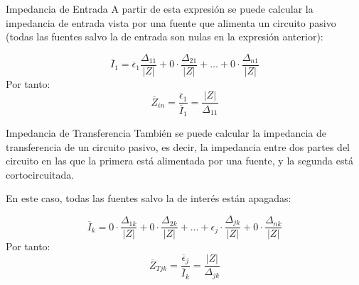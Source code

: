 \documentclass[aspectratio=169, usenames,svgnames,dvipsnames]{beamer}
\begin{document}
\begin{frame}[label={sec:org933db58}]{Impedancia de Entrada}
A partir de esta expresión se puede calcular la impedancia de entrada vista por una fuente que alimenta un circuito pasivo (todas las fuentes salvo la de entrada son nulas en la expresión anterior):

\[
  \overline{I}_1 = \overline{\epsilon}_1 \frac{\Delta_{11}}{|Z|} + 0 \cdot \frac{\Delta_{21}}{|Z|} + \dots + 0 \cdot \frac{\Delta_{n1}}{|Z|}
\]
Por tanto:
\[
  \boxed{\overline{Z}_{in} = \frac{\overline{\epsilon}_1}{\overline{I}_1}=  \frac{|Z|}{\Delta_{11}}}
\]
\end{frame}

\begin{frame}[label={sec:org719d771}]{Impedancia de Transferencia}
También se puede calcular la impedancia de transferencia de un circuito pasivo, es decir, la impedancia entre dos partes del circuito en las que la primera está alimentada por una fuente, y la segunda está cortocircuitada.

En este caso, todas las fuentes salvo la de interés están apagadas:

\[
  \overline{I}_k = 0 \cdot \frac{\Delta_{1k}}{|Z|} + 0 \cdot \frac{\Delta_{2k}}{|Z|} + \dots + \epsilon_j \cdot \frac{\Delta_{jk}}{|Z|} + 0 \cdot \frac{\Delta_{nk}}{|Z|}
\]
Por tanto:
\[
  \boxed{\overline{Z}_{Tjk} = \frac{\overline{\epsilon}_j}{\overline{I}_k}=  \frac{|Z|}{\Delta_{jk}}}
\]
\end{frame}
\end{document}
